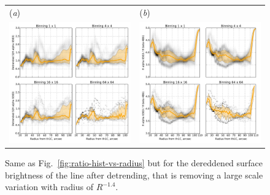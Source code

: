 \documentclass[preprint]{aastex}
\begin{document}
\begin{figure}[p]
  \begin{tabular}{ll}
    (\textit{a}) & (\textit{b}) \\
    \includegraphics{sha-vs-radius-binning-new} &
    \includegraphics{rha-hb-vs-radius-binning-new} \\
  \end{tabular}
  \caption{Same as Fig.~\ref{fig:ratio-hist-vs-radius} but for the
    dereddened surface brightness of the \ha{} line after detrending,
    that is removing a large scale variation with radius of
    \(R^{-1.4}\).}
  \label{fig:sha-hist-vs-radius}
\end{figure}
\end{document}
